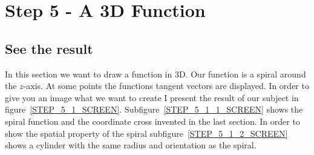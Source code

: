 \section{Step 5 - A 3D Function}
\subsection{See the result}
In this section we want to draw a function in 3D.
Our function is a spiral around the $z$-axis.
At some points the functions tangent vectors are displayed.
In order to give you an image what we want to create I present the result of our subject in figure~\ref{STEP_5_1_SCREEN}.
Subfigure~\ref{STEP_5_1_1_SCREEN} shows the spiral function and the coordinate cross invented in the last section.
In order to show the spatial property of the spiral subfigure~\ref{STEP_5_1_2_SCREEN} shows a cylinder with the same radius and orientation as the spiral.
